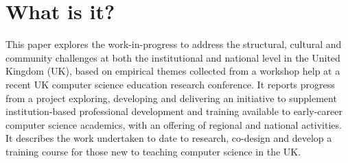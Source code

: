 \documentclass[sigconf]{acmart}
\begin{document}



\maketitle

\section{What is it?}	
This paper explores the work-in-progress to address the structural, cultural and community challenges at both the institutional and national level in the United Kingdom (UK), based on empirical themes collected from a workshop help at a recent UK computer science education research conference. It reports progress from a project exploring, developing and delivering an initiative to supplement institution-based professional development and training available to early-career computer science academics, with an offering of regional and national activities. It describes the work undertaken to date to research, co-design and develop a training course for those new to teaching computer science in the UK. 
\end{document}
